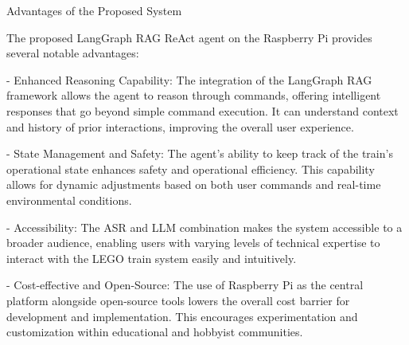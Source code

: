 Advantages of the Proposed System

The proposed LangGraph RAG ReAct agent on the Raspberry Pi provides several notable advantages:

- Enhanced Reasoning Capability: The integration of the LangGraph RAG framework allows the agent to reason through commands, offering intelligent responses that go beyond simple command execution. It can understand context and history of prior interactions, improving the overall user experience.

- State Management and Safety: The agent's ability to keep track of the train's operational state enhances safety and operational efficiency. This capability allows for dynamic adjustments based on both user commands and real-time environmental conditions.

- Accessibility: The ASR and LLM combination makes the system accessible to a broader audience, enabling users with varying levels of technical expertise to interact with the LEGO train system easily and intuitively.

- Cost-effective and Open-Source: The use of Raspberry Pi as the central platform alongside open-source tools lowers the overall cost barrier for development and implementation. This encourages experimentation and customization within educational and hobbyist communities.
